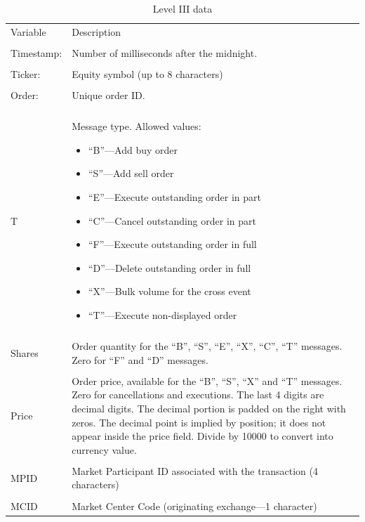 	\begin{table}[!ht]
	\centering
	\begin{tabular}{lp{}} \hline
	Variable & Description \\
	& \\
	Timestamp: & Number of milliseconds after the midnight. \\
	& \\
	Ticker: & Equity symbol (up to 8 characters) \\
	& \\
	Order: & Unique order ID. \\
	& \\
	T & Message type. Allowed values: \newline \begin{minipage}[t]{0.6\textwidth} \begin{itemize} \item ``B''---Add buy order \item ``S''---Add sell order \item ``E''---Execute outstanding order in part \item ``C''---Cancel outstanding order in part \item ``F''---Execute outstanding order in full \item ``D''---Delete outstanding order in full \item ``X''---Bulk volume for the cross event \item ``T''---Execute non-displayed order \end{itemize} \end{minipage} \\
	& \\
	Shares & Order quantity for the ``B'', ``S'', ``E'', ``X'', ``C'', ``T'' messages. Zero for ``F'' and ``D'' messages. \\
	& \\
	Price & Order price, available for the ``B'', ``S'', ``X'' and ``T'' messages. \newline Zero for cancellations and executions. The last 4 digits are decimal digits. The decimal portion is padded on the right with zeros. The decimal point is implied by position; it does not appear inside the price field. Divide by 10000 to convert into currency value. \\ 
	& \\
	MPID & Market Participant ID associated with the transaction (4 characters) \\
	& \\
	MCID & Market Center Code (originating exchange---1 character) 
	\end{tabular}
	\caption{Level III data \label{tab:level3data}}
	\end{table}
	

